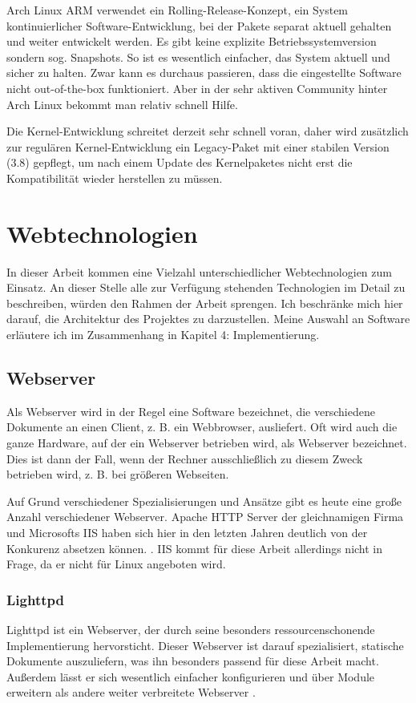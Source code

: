 Arch Linux ARM verwendet ein Rolling-Release-Konzept, ein System kontinuierlicher Software-Entwicklung, bei der Pakete separat aktuell gehalten und weiter entwickelt werden. Es gibt keine explizite Betriebssystemversion sondern sog. Snapshots. So ist es  wesentlich einfacher, das System aktuell und sicher zu halten. Zwar kann es durchaus passieren, dass die eingestellte Software nicht out-of-the-box funktioniert. Aber in der sehr aktiven Community hinter Arch Linux bekommt man relativ schnell Hilfe.

Die Kernel-Entwicklung schreitet derzeit sehr schnell voran, daher wird zusätzlich zur regulären Kernel-Entwicklung  ein Legacy-Paket mit einer stabilen Version (3.8) gepflegt, um nach einem Update des Kernelpaketes nicht erst die Kompatibilität wieder herstellen zu müssen.


\section{Webtechnologien}
In dieser Arbeit kommen eine Vielzahl unterschiedlicher Webtechnologien zum Einsatz. An dieser Stelle alle zur Verfügung stehenden Technologien im Detail zu beschreiben, würden den Rahmen der Arbeit sprengen. Ich beschränke mich hier darauf, die Architektur des Projektes zu darzustellen. Meine Auswahl an Software erläutere ich im Zusammenhang in Kapitel 4: Implementierung.

\subsection{Webserver}
Als Webserver wird in der Regel eine Software bezeichnet, die verschiedene Dokumente an einen Client, z. B. ein Webbrowser, ausliefert. Oft wird auch die ganze Hardware, auf der ein Webserver betrieben wird, als Webserver bezeichnet. Dies ist dann der Fall, wenn der Rechner ausschließlich zu diesem Zweck betrieben wird, z. B. bei größeren Webseiten.

Auf Grund verschiedener Spezialisierungen und Ansätze gibt es heute eine große Anzahl verschiedener Webserver. Apache HTTP Server der gleichnamigen Firma und Microsofts IIS haben sich hier in den letzten Jahren deutlich von der Konkurenz absetzen können. \cite{webserversurvey1014}. IIS kommt für diese Arbeit allerdings nicht in Frage, da er nicht für Linux angeboten wird.

\subsubsection{Lighttpd}
Lighttpd ist ein Webserver, der durch seine besonders ressourcenschonende Implementierung hervorsticht. Dieser Webserver ist darauf spezialisiert, statische Dokumente auszuliefern, was ihn besonders passend für diese Arbeit macht. Außerdem lässt er sich wesentlich einfacher konfigurieren und über Module erweitern als andere weiter verbreitete Webserver \cite{krieg2009}.


